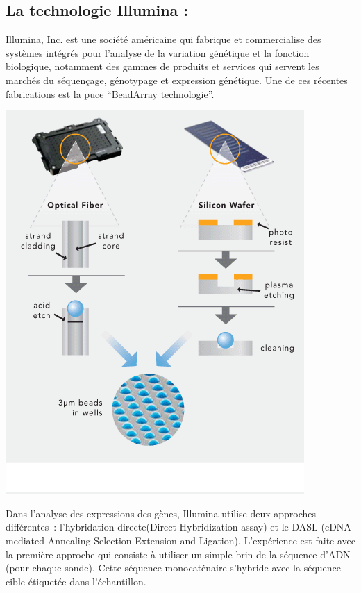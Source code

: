\documentclass[a4paper,10pt]{article}
\begin{document}
\subsection{La technologie Illumina :}
Illumina, Inc. est une société américaine qui fabrique et commercialise des systèmes intégrés pour l'analyse de la variation génétique et la fonction biologique, 
notamment des gammes de produits et services qui servent les marchés du séquençage, génotypage et expression génétique.
\newline
Une de ces récentes fabrications est la puce ``BeadArray technologie''.
\begin{center}
 \includegraphics[scale=0.5]{./image/beadarray.png}
\end{center}
Dans l’analyse des expressions des gènes, Illumina utilise deux approches différentes : l’hybridation directe(Direct Hybridization assay) et le DASL (cDNA-mediated Annealing Selection Extension and Ligation).
L’expérience est faite avec la première approche qui consiste à utiliser un simple brin de la séquence d’ADN (pour chaque sonde). Cette séquence monocaténaire s’hybride avec la séquence cible étiquetée dans l’échantillon. 
\end{document}
